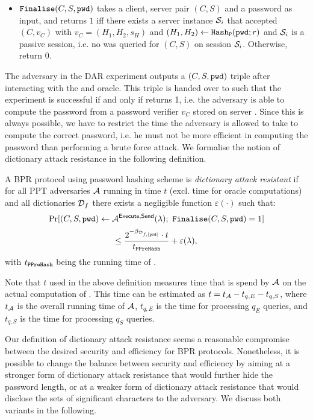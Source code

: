 \begin{itemize}
  \item $\mathtt{Finalise}(C,S,\mathtt{pwd})$ takes a client, server pair $(C,S)$ and a password \pwd as input, and returns $1$ iff there exists a server instance $\mathcal{S}_i$ that accepted $(C,v_C)$ with $v_C=(H_1,H_2,s_H)$ and $(H_1,H_2)\gets\mathtt{Hash_P}(\mathtt{pwd};r)$ and $\mathcal{S}_i$ is a passive session, i.e. no \Send was queried for $(C,S)$ on session $\mathcal{S}_i$.
        Otherwise, return $0$.
\end{itemize}

\noindent
The adversary in the DAR experiment outputs a $(C,S,\mathtt{pwd})$ triple after interacting with the \Execute and \Send oracle.
This triple is handed over to \Finalise such that the experiment is successful if and only if \Finalise returns 1, i.e. the adversary is able to compute the password \pwd from a password verifier $v_C$ stored on server \Server.
Since this is always possible, we have to restrict the time the adversary is allowed to take to compute the correct password, i.e. he must not be more efficient in computing the password than performing a brute force attack.
We formalise the notion of dictionary attack resistance in the following definition.

\begin{definition}\label{def:dar}
A \ac{BPR} protocol using password hashing scheme \Hash is \emph{dictionary attack resistant} if for all PPT adversaries $\mathcal{A}$ running in time $t$ (excl. time for oracle computations) and all dictionaries $\mathcal{D}_f$ there exists a negligible function $\varepsilon(\cdot)$ such that:
\[\Pr[(C,S,\mathtt{pwd})\gets\mathcal{A}^{\mathsf{Execute}, \mathsf{Send}}(\lambda);~ \mathtt{Finalise}(C,S,\mathtt{pwd})=1] \]
\[\leq \frac{2^{-\beta_{\mathcal{D}_{f,|\mathtt{pwd}|}}}\cdot t}{t_{\mathtt{PPreHash}}} + \varepsilon(\lambda),\]
with $t_\mathtt{PPreHash}$ being the running time of \PPreHash.
\eod
\end{definition}

\noindent
Note that $t$ used in the above definition measures time that is spend by $\mathcal{A}$ on the actual computation of \pwd. This time can be estimated as $t=t_\mathcal{A}-t_{q,E}-t_{q,S}$, where  $t_\mathcal{A}$ is the overall running time of $\mathcal{A}$, $t_{q,E}$ is the time for processing $q_E$ \Execute queries, and $t_{q,S}$ is the time for processing $q_S$ \Send queries. 


Our definition of dictionary attack resistance seems a reasonable compromise between the desired security and efficiency for \ac{BPR} protocols.
Nonetheless, it is possible to change the balance between security and efficiency by aiming at a stronger form of dictionary attack resistance that would further hide the password length, or at a weaker form of dictionary attack resistance that would disclose the sets of significant characters to the adversary. We discuss both variants in the following.

